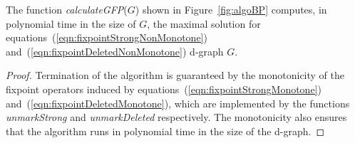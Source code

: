 \begin{theorem}\label{the:algoCorrectness}
  The function \textit{calculateGFP}($G$) shown in Figure~\ref{fig:algoBP}
  computes, in polynomial time in the size of $G$, the maximal solution for
  equations~(\ref{eqn:fixpointStrongNonMonotone})
  and~(\ref{eqn:fixpointDeletedNonMonotone}) \wrt d-graph $G$.
\end{theorem}
%
\begin{proof}
	Termination of the algorithm is guaranteed by the monotonicity of the fixpoint
	operators induced by equations~(\ref{eqn:fixpointStrongMonotone})
	and~(\ref{eqn:fixpointDeletedMonotone}), which are implemented by the functions
	\textit{unmarkStrong} and \textit{unmarkDeleted} respectively. The monotonicity
	also ensures that the algorithm runs in polynomial time in the size of the
	d-graph.
\end{proof}

